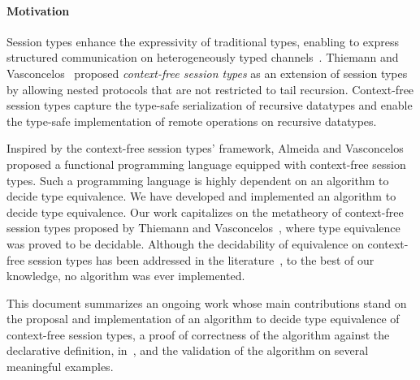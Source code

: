 \paragraph{Motivation}
\label{sec:introduction}

Session types enhance the expressivity of traditional types, enabling
to express structured communication on heterogeneously typed
channels~\cite{DBLP:conf/concur/Honda93,DBLP:conf/parle/TakeuchiHK94}.
Thiemann and
Vasconcelos~\cite{thiemann2016context} proposed {\it context-free
  session types} as an extension of session types by allowing nested
protocols that are not restricted to tail recursion. Context-free
session types capture the type-safe serialization of recursive
datatypes and enable the type-safe implementation of remote operations
on recursive datatypes.

Inspired by the context-free session types' framework, Almeida and
Vasconcelos~\cite{bernardo} proposed a functional programming language
equipped with context-free session types.  Such a programming language
is highly dependent on an algorithm to decide type equivalence. We
have developed and implemented an algorithm to decide type
equivalence. Our work capitalizes on the metatheory of context-free
session types proposed by Thiemann and
Vasconcelos~\cite{thiemann2016context}, where type equivalence was
proved to be decidable. Although the decidability of equivalence on
context-free session types has been addressed in the
literature~\cite{DBLP:journals/iandc/ChristensenHS95,janvcar1999techniques,thiemann2016context},
to the best of our knowledge, no algorithm was ever implemented.

This document summarizes an ongoing work whose main contributions
stand on the proposal and implementation of an algorithm to decide
type equivalence of context-free session types, a proof of correctness of
the algorithm against the declarative definition,
in~\cite{thiemann2016context}, %
and the validation of  the algorithm on several meaningful examples.


